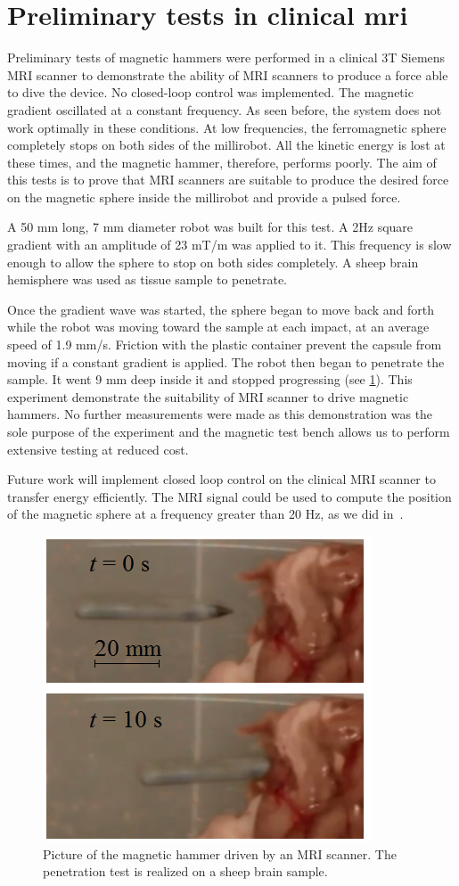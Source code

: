 \documentclass[letterpaper, 10 pt, conference]{ieeeconf}  %
\begin{document}
\section{Preliminary tests in clinical mri}
\label{MRI_tests}
Preliminary tests of magnetic hammers were performed in a clinical 3T Siemens MRI scanner to demonstrate the ability of MRI scanners to produce a force able to dive the device.
No closed-loop control was implemented. 
The magnetic gradient  oscillated at a constant frequency. 
As seen before, the system does not work optimally in these conditions. 
At low frequencies, the ferromagnetic sphere completely stops on both sides of the millirobot. 
All the kinetic energy is lost at these times, and the magnetic hammer, therefore, performs poorly. 
The aim of this tests is to prove that MRI scanners are suitable to produce the desired force on the magnetic sphere inside the millirobot and provide a pulsed force.\par
A 50 mm long, 7 mm diameter robot was built for this test. 
A 2Hz square gradient with an amplitude of 23 mT/m was applied to it. 
This frequency is slow enough to allow the sphere to stop on both sides completely. 
A sheep brain hemisphere was used as tissue sample to penetrate.\par
Once the gradient wave was started, the sphere began to move back and forth while the robot was moving toward the sample at each impact, at an average speed of 1.9 mm/s. Friction with the plastic container prevent the capsule from moving if a constant gradient is applied. 
 The robot then began to penetrate the sample. It went 9 mm deep inside it and stopped progressing (see \cref{MRI_test}). 
This experiment demonstrate the suitability of MRI scanner to drive magnetic hammers. No further measurements were made as this demonstration was the sole purpose of the experiment and the magnetic test bench allows us to perform extensive testing at reduced cost.\par
Future work will implement closed loop control on the clinical MRI scanner to transfer energy efficiently. 
The MRI signal could be used to compute the position of the magnetic sphere at a frequency greater than 20 Hz, as we did in~\cite{578}.

\begin{figure}
\centering
  \includegraphics[width=150 pt]{tests_in_MRI.png}
  \caption{Picture of the magnetic hammer driven by an MRI scanner. The penetration test is realized on a sheep brain sample.}
  \label{MRI_test}
\end{figure}
\end{document}
